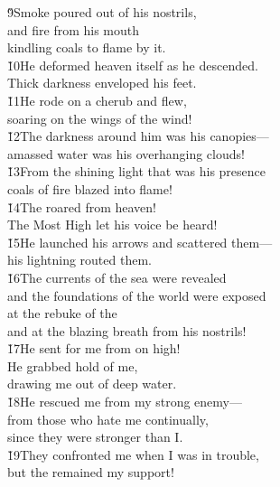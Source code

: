 \begin{poetry}
\poeml \v{9}Smoke poured out of his nostrils, \\
\poemll    and fire from his mouth \\
\poemlll       kindling coals to flame by it. \\
\poeml \v{10}He deformed heaven itself as he descended. \\
\poemll    Thick darkness enveloped his feet. \\
\poeml \v{11}He rode on a cherub and flew, \\
\poemll    soaring on the wings of the wind! \\
\poeml \v{12}The darkness around him was his canopies--- \\
\poemll    amassed water was his overhanging clouds! \\
\poeml \v{13}From the shining light that was his presence \\
\poemll    coals of fire blazed into flame! \\
\poeml \v{14}The  roared from heaven! \\
\poemll    The Most High let his voice be heard! \\
\poeml \v{15}He launched his arrows and scattered them--- \\
\poemll    his lightning routed them. \\
\poeml \v{16}The currents of the sea were revealed \\
\poemll    and the foundations of the world were exposed \\
\poeml at the rebuke of the  \\
\poemll    and at the blazing breath from his nostrils! \\
\poeml \v{17}He sent for me from on high! \\
\poemll    He grabbed hold of me, \\
\poemlll       drawing me out of deep water. \\
\poeml \v{18}He rescued me from my strong enemy--- \\
\poemll    from those who hate me continually, \\
\poemlll       since they were stronger than I. \\
\poeml \v{19}They confronted me when I was in trouble, \\
\poemll    but the  remained my support! \\

\end{poetry}
